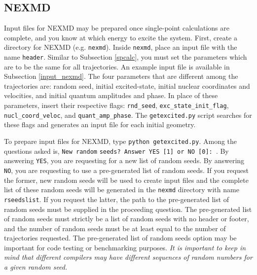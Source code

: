 \documentclass[letterpaper,12pt,titlepage]{article}
\begin{document}
\subsection{NEXMD}
\label{nexmd}
Input files for NEXMD may be prepared once single-point calculations are complete, and you know at which energy to excite the system.  First, create a directory for NEXMD (e.g. \verb+nexmd+).  Inside \verb+nexmd+, place an input file with the name \verb+header+.  Similar to Subsection \ref{spcalc}, you must set the parameters which are to be the same for all trajectories.  An example input file is available in Subsection \ref{input_nexmd}.  The four parameters that are different among the trajectories are: random seed, initial excited-state, initial nuclear coordinates and velocities, and initial quantum amplitudes and phase.  In place of these parameters, insert their respective flags: \verb+rnd_seed+, \verb+exc_state_init_flag+, \verb+nucl_coord_veloc+, and \verb+quant_amp_phase+.  The \verb+getexcited.py+ script searches for these flags and generates an input file for each initial geometry.

To prepare input files for NEXMD, type \verb+python getexcited.py+.  Among the questions asked is, \verb+New random+ \verb+seeds? Answer YES [1] or NO [0]: +.  By answering \verb+YES+, you are requesting for a new list of random seeds.  By answering \verb+NO+, you are requesting to use a pre-generated list of random seeds.  If you request the former, new random seeds will be used to create input files and the complete list of these random seeds will be generated in the \verb+nexmd+ directory with name \verb+rseedslist+.  If you request the latter, the path to the pre-generated list of random seeds must be supplied in the proceeding question.  The pre-generated list of random seeds must strictly be a list of random seeds with no header or footer, and the number of random seeds must be at least equal to the number of trajectories requested.  The pre-generated list of random seeds option may be important for code testing or benchmarking purposes.  \textit{It is important to keep in mind that different compilers may have different sequences of random numbers for a given random seed.}
\end{document}
